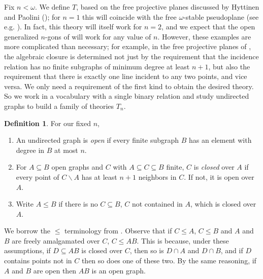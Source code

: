 \documentclass[11pt]{amsart}
\newcommand{\sidebar}[1]{\vskip10pt\noindent
 \hskip.70truein\vrule width2.0pt\hskip.5em
 \vbox{\hsize= 4truein\noindent\footnotesize\relax #1 }\vskip10pt\noindent}
\theoremstyle{definition}
\newtheorem{definition}[theorem]{Definition}
\theoremstyle{remark}
\numberwithin{equation}{section}
\begin{document}
Fix $n < \omega$. We define $T$, based on the free projective planes
discussed by Hyttinen and Paolini (\cite{HP21}); for $n =1$ this will
coincide with the free $\omega$-stable pseudoplane (see e.g. \cite{P96}). In
fact, this theory will itself work for $n = 2$, and we expect that the open
generalized $n$-gons of \cite{AT23} will work for any value of $n$. However,
these examples are more complicated than necessary; for example, in the free
projective planes of \cite{HP21}, the algebraic closure is determined not
just by the requirement that the incidence relation has no finite subgraphs
of minimum degree at least $n+1$, but also the requirement that there  is
exactly one line incident to any two points, and vice versa.
We only need a
requirement of the first kind to obtain the desired theory. So we work in a vocabulary
with a single binary relation and study undirected graphs to build a family of theories $T_n$.

\begin{definition}\label{newopen} For our fixed $n$,
\begin{enumerate}
\item An undirected graph is \textit{open} if every finite subgraph $B$ has
    an element with degree in $B$ at most   $n$.

\item For $A \subseteq B$ open graphs and $C$ with $A\subseteq C \subseteq
    B$ finite, $C$ is \textit{closed} over $A$ if every point of $C
    \backslash A$ has at least $n+1$ neighbors in $C$.  If not, it is open
    over $A$.
    \item Write $A \leq B$ if there is no $C \subseteq B$, $C$ not
    contained in $A$, which is closed over $A$.
    \end{enumerate}
\end{definition}

We borrow the $\leq$ terminology from \cite{HP21}.
Observe that if $C \leq A$, $C \leq B$ and $A$ and $B$ are freely amalgamated
over $C$, $C \leq AB$. This is because, under these assumptions, if $D \subseteq AB$ is
closed over $C$, then so is $D \cap A$ and $D \cap B$, and if $D$ contains
points not in $C$ then so does one of these two. By the same reasoning, if
$A$ and $B$ are open then $AB$ is an open graph.




%
\end{document}
